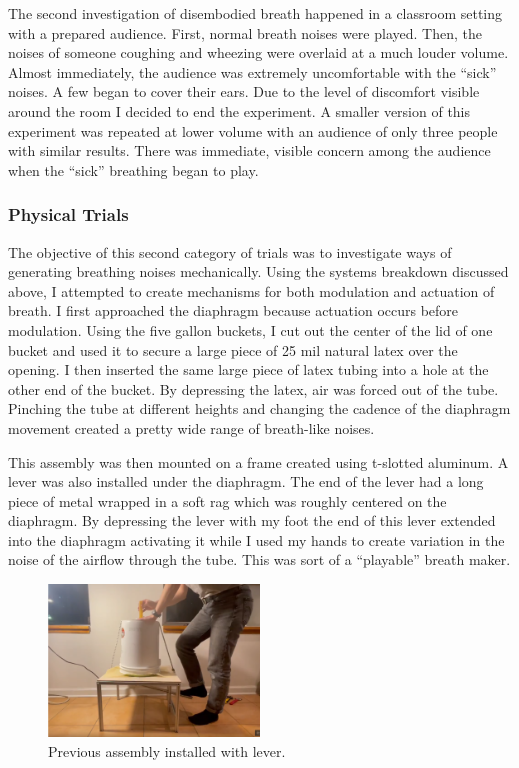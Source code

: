 \documentclass[letterpaper]{article}
\begin{document}
The second investigation of disembodied breath happened in a classroom setting with a prepared audience. First, normal breath noises were played. Then, the noises of someone coughing and wheezing were overlaid at a much louder volume. Almost immediately, the audience was extremely uncomfortable with the ``sick'' noises. A few began to cover their ears. Due to the level of discomfort visible around the room I decided to end the experiment. A smaller version of this experiment was repeated at lower volume with an audience of only three people with similar results. There was immediate, visible concern among the audience when the ``sick'' breathing began to play.

\subsubsection{Physical Trials}

The objective of this second category of trials was to investigate ways of generating breathing noises mechanically. Using the systems breakdown discussed above, I attempted to create mechanisms for both modulation and actuation of breath. I first approached the diaphragm because actuation occurs before modulation. Using the five gallon buckets, I cut out the center of the lid of one bucket and used it to secure a large piece of 25 mil natural latex over the opening. I then inserted the same large piece of latex tubing into a hole at the other end of the bucket. By depressing the latex, air was forced out of the tube. Pinching the tube at different heights and changing the cadence of the diaphragm movement created a pretty wide range of breath-like noises. 


This assembly was then mounted on a frame created using t-slotted aluminum. A lever was also installed under the diaphragm. The end of the lever had a long piece of metal wrapped in a soft rag which was roughly centered on the diaphragm. By depressing the lever with my foot the end of this lever extended into the diaphragm activating it while I used my hands to create variation in the noise of the airflow through the tube. This was sort of a ``playable'' breath maker. 

\begin{figure}[h]
\includegraphics[width=0.5\textwidth]{images/playablebreath1.png}
\caption{Previous assembly installed with lever.}
\end{figure}
\end{document}
